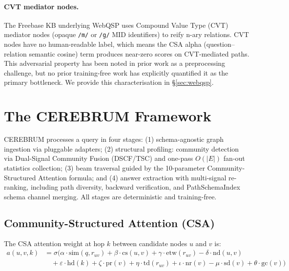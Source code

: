 \documentclass[11pt,a4paper]{article}
\begin{document}
\paragraph{CVT mediator nodes.}
The Freebase KB underlying WebQSP uses Compound Value Type (CVT) mediator nodes
(opaque \texttt{/m/} or \texttt{/g/} MID identifiers) to reify n-ary
relations. CVT nodes have no human-readable label, which means the CSA alpha
(question–relation semantic cosine) term produces near-zero scores on
CVT-mediated paths. This adversarial property has been noted in prior work
\cite{sun2018graftnet,webqsp2016} as a preprocessing challenge, but no prior
training-free work has explicitly quantified it as the primary bottleneck. We
provide this characterisation in \S\ref{sec:webqsp}.

\section{The CEREBRUM Framework}

CEREBRUM processes a query in four stages: (1) schema-agnostic graph ingestion
via pluggable adapters; (2) structural profiling: community detection via
Dual-Signal Community Fusion (DSCF/TSC) and one-pass $O(|E|)$ fan-out statistics
collection; (3) beam traversal guided by the 10-parameter Community-Structured
Attention formula; and (4) answer extraction with multi-signal re-ranking,
including path diversity, backward verification, and PathSchemaIndex schema
channel merging. All stages are deterministic and training-free.

\subsection{Community-Structured Attention (CSA)}
\label{sec:csa}

The CSA attention weight at hop $k$ between candidate nodes $u$ and $v$ is:
\begin{align}
a(u, v, k) &= \sigma\bigl(
    \alpha \cdot \mathrm{sim}(q, r_{uv})
  + \beta  \cdot \mathrm{cs}(u, v)
  + \gamma \cdot \mathrm{etw}(r_{uv})
  - \delta \cdot \mathrm{nd}(u, v) \nonumber\\
  &\quad + \varepsilon \cdot \mathrm{hd}(k)
  + \zeta  \cdot \mathrm{pr}(v)
  + \eta   \cdot \mathrm{td}(r_{uv})
  + \iota  \cdot \mathrm{nr}(v)
  - \mu    \cdot \mathrm{sd}(v)
  + \theta \cdot \mathrm{gc}(v)
\bigr)
\end{align}
\end{document}
